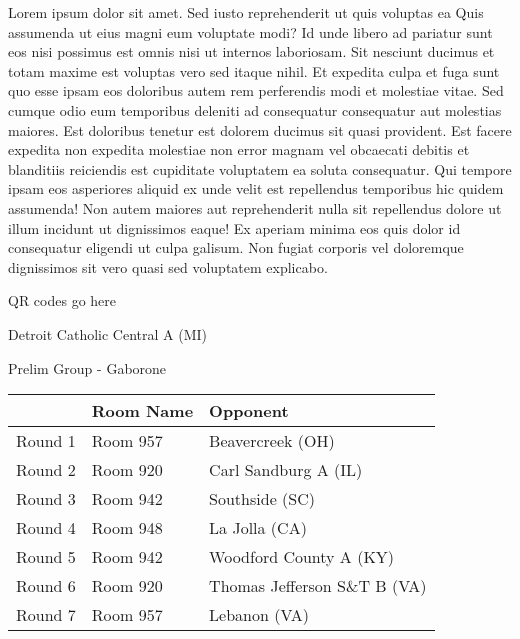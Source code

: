 \documentclass{article}%
\begin{document}
\vspace*{8pt}%
\linebreak%
\newline%
\newline%
Lorem ipsum dolor sit amet. Sed iusto reprehenderit ut quis voluptas ea Quis assumenda ut eius magni eum voluptate modi? Id unde libero ad pariatur sunt eos nisi possimus est omnis nisi ut internos laboriosam. Sit nesciunt ducimus et totam maxime est voluptas vero sed itaque nihil. Et expedita culpa et fuga sunt quo esse ipsam eos doloribus autem rem perferendis modi et molestiae vitae.\newline%
\newline%
Sed cumque odio eum temporibus deleniti ad consequatur consequatur aut molestias maiores. Est doloribus tenetur est dolorem ducimus sit quasi provident. Est facere expedita non expedita molestiae non error magnam vel obcaecati debitis et blanditiis reiciendis est cupiditate voluptatem ea soluta consequatur. Qui tempore ipsam eos asperiores aliquid ex unde velit est repellendus temporibus hic quidem assumenda!\newline%
\newline%
Non autem maiores aut reprehenderit nulla sit repellendus dolore ut illum incidunt ut dignissimos eaque! Ex aperiam minima eos quis dolor id consequatur eligendi ut culpa galisum. Non fugiat corporis vel doloremque dignissimos sit vero quasi sed voluptatem explicabo.\newline%
\newline%
%
\vspace*{30pt}%
\begin{center}%
\begin{Huge}%
QR codes go here%
\end{Huge}%
\end{center}%
\newpage%
%
\begin{center}%
\begin{Huge}%
Detroit Catholic Central A (MI)%
\end{Huge}%
\vspace*{8pt}%
\linebreak%
\begin{Large}%
Prelim Group {-} Gaborone%
\end{Large}%
\end{center}%
\begin{tabularx}{\textwidth}{|c|Y|Y|}%
\hline%
&Room Name&Opponent\\%
\hline%
Round 1&Room 957&Beavercreek (OH)\\%
Round 2&Room 920&Carl Sandburg A (IL)\\%
Round 3&Room 942&Southside (SC)\\%
Round 4&Room 948&La Jolla (CA)\\%
Round 5&Room 942&Woodford County A (KY)\\%
Round 6&Room 920&Thomas Jefferson S\&T B (VA)\\%
Round 7&Room 957&Lebanon (VA)\\%
\hline%
\end{tabularx}%
\end{document}
